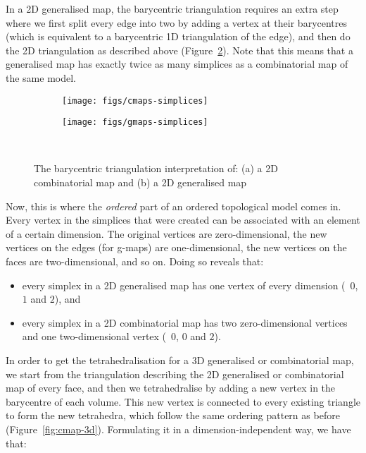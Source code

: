 In a 2D generalised map, the barycentric triangulation requires an extra step where we first split every edge into two by adding a vertex at their barycentres (which is equivalent to a barycentric 1D triangulation of the edge), and then do the 2D triangulation as described above (Figure~\ref{subfig:gmaps-simplices}).
Note that this means that a generalised map has exactly twice as many simplices as a combinatorial map of the same model.

\begin{figure}
\centering
\begin{subfigure}{0.3\linewidth}
\texttt{[image: figs/cmaps-simplices]}
\caption{}%
\label{subfig:cmaps-simplices}
\end{subfigure}
\quad
\begin{subfigure}{0.3\linewidth}
\texttt{[image: figs/gmaps-simplices]}
\caption{}%
\label{subfig:gmaps-simplices}
\end{subfigure}\\
\caption{The barycentric triangulation interpretation of: (a) a 2D combinatorial map and (b) a 2D generalised map}%
\label{fig:maps-simplices}
\end{figure}

Now, this is where the \emph{ordered} part of an ordered topological model comes in.
Every vertex in the simplices that were created can be associated with an element of a certain dimension.
The original vertices are zero-dimensional, the new vertices on the edges (for g-maps) are one-dimensional, the new vertices on the faces are two-dimensional, and so on.
Doing so reveals that:

\begin{itemize}
\item every simplex in a 2D generalised map has one vertex of every dimension (\ie\ \(0\), \(1\) and \(2\)), and
\item every simplex in a 2D combinatorial map has two zero-dimensional vertices and one two-di\-men\-sio\-nal vertex (\ie\ \(0\), \(0\) and \(2\)).
\end{itemize}

In order to get the tetrahedralisation for a 3D generalised or combinatorial map, we start from the triangulation describing the 2D generalised or combinatorial map of every face, and then we tetrahedralise by adding a new vertex in the barycentre of each volume.
This new vertex is connected to every existing triangle to form the new tetrahedra, which follow the same ordering pattern as before (Figure~\ref{fig:cmap-3d}).
Formulating it in a dimension-independent way, we have that:


